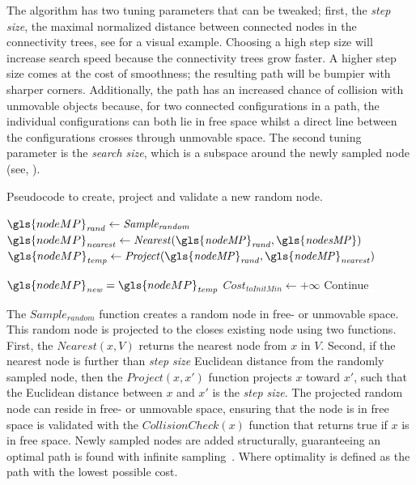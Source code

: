 The algorithm has two tuning parameters that can be tweaked; first, the \textit{step size}, the maximal normalized distance between connected nodes in the connectivity trees, see  for a visual example. Choosing a high step size will increase search speed because the connectivity trees grow faster. A higher step size comes at the cost of smoothness; the resulting path will be bumpier with sharper corners. Additionally, the path has an increased chance of collision with unmovable objects because, for two connected configurations in a path, the individual configurations can both lie in free space whilst a direct line between the configurations crosses through unmovable space. The second tuning parameter is the \textit{search size}, which is a subspace around the newly sampled node (see, ).\bs

\begin{algorithm}[H]
\caption{Pseudocode to create, project and validate a new random node.}%
\label{pseudocode:proposed_rrt_star_one}
\begin{algorithmic}[1]
  \hspace{-0.9cm}\colorbox{my_light_blue}{\parbox{\linewidth}{%
    \State $\gls{nodeMP}_\mathit{rand} \leftarrow \mathit{Sample_{random}}$
    \State $\gls{nodeMP}_\mathit{nearest} \leftarrow \mathit{Nearest(\gls{nodeMP}_{rand}, \gls{nodesMP})}$
    \State $\gls{nodeMP}_\mathit{temp} \leftarrow \mathit{Project(\gls{nodeMP}_{rand}, \gls{nodeMP}_{nearest})}$

    \State $\gls{nodeMP}_\mathit{new} = \gls{nodeMP}_\mathit{temp}$
    \State $Cost_\mathit{toInitMin} \leftarrow +\infty$
    \Else
        \State Continue
    \EndIf
}}
\end{algorithmic}
\end{algorithm}

The $\mathit{Sample_{random}}$ function creates a random node in free- or unmovable space. This random node is projected to the closes existing node using two functions. First, the $\mathit{Nearest}(x, V)$ returns the nearest node from $x$ in $V$. Second, if the nearest node is further than \textit{step size} Euclidean distance from the randomly sampled node, then the $\mathit{Project}(x, x')$ function projects $x$ toward $x'$, such that the Euclidean distance between $x$ and $x'$ is the \textit{step size}. The projected random node can reside in free- or unmovable space, ensuring that the node is in free space is validated with the $\mathit{CollisionCheck}(x)$ function that returns true if $x$ is in free space. Newly sampled nodes are added structurally, guaranteeing an optimal path is found with infinite sampling~\cite{chen_fast_2018}. Where optimality is defined as the path with the lowest possible cost.\bs

